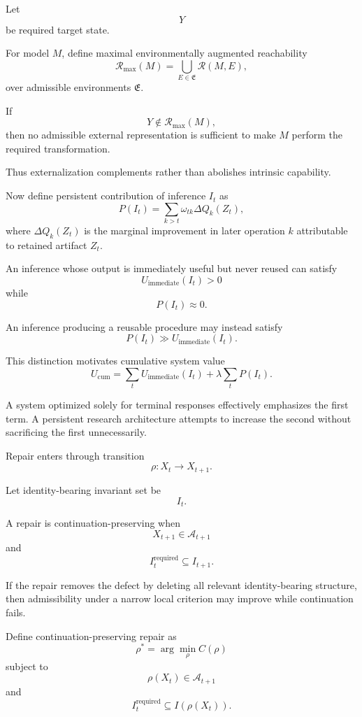 \documentclass[11pt]{article}
\begin{document}
Let
\[
    Y
\]
be required target state.

For model \(M\), define maximal environmentally augmented reachability
\[
    \mathcal{R}_{\max}(M)
    =
    \bigcup_{E\in\mathfrak{E}}
    \mathcal{R}(M,E),
\]
over admissible environments \(\mathfrak{E}\).

If
\[
    Y\notin\mathcal{R}_{\max}(M),
\]
then no admissible external representation is sufficient to make \(M\) perform the required transformation.

Thus externalization complements rather than abolishes intrinsic capability.

Now define persistent contribution of inference \(I_t\) as
\[
    P(I_t)
    =
    \sum_{k>t}
    \omega_{tk}
    \Delta Q_k(Z_t),
\]
where \(\Delta Q_k(Z_t)\) is the marginal improvement in later operation \(k\) attributable to retained artifact \(Z_t\).

An inference whose output is immediately useful but never reused can satisfy
\[
    U_{\mathrm{immediate}}(I_t)>0
\]
while
\[
    P(I_t)\approx0.
\]

An inference producing a reusable procedure may instead satisfy
\[
    P(I_t)
    \gg
    U_{\mathrm{immediate}}(I_t).
\]

This distinction motivates cumulative system value
\[
    U_{\mathrm{cum}}
    =
    \sum_t
    U_{\mathrm{immediate}}(I_t)
    +
    \lambda
    \sum_t
    P(I_t).
\]

A system optimized solely for terminal responses effectively emphasizes the first term. A persistent research architecture attempts to increase the second without sacrificing the first unnecessarily.

Repair enters through transition
\[
    \rho:
    X_t\rightarrow X_{t+1}.
\]

Let identity-bearing invariant set be
\[
    I_t.
\]

A repair is continuation-preserving when
\[
    X_{t+1}\in\mathcal{A}_{t+1}
\]
and
\[
    I_t^{\mathrm{required}}
    \subseteq
    I_{t+1}.
\]

If the repair removes the defect by deleting all relevant identity-bearing structure, then admissibility under a narrow local criterion may improve while continuation fails.

Define continuation-preserving repair as
\[
    \rho^\ast
    =
    \arg\min_{\rho}
    C(\rho)
\]
subject to
\[
    \rho(X_t)\in\mathcal{A}_{t+1}
\]
and
\[
    I_t^{\mathrm{required}}
    \subseteq
    I(\rho(X_t)).
\]
\end{document}
